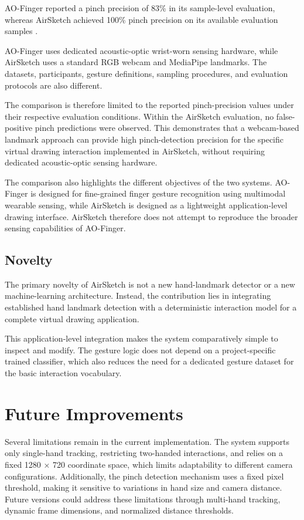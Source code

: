 \documentclass[conference]{IEEEtran}
\begin{document}
AO-Finger reported a pinch precision of 83\% in its sample-level evaluation, whereas AirSketch achieved 100\% pinch precision on its available evaluation samples \cite{ao_finger}.

AO-Finger uses dedicated acoustic-optic wrist-worn sensing hardware, while AirSketch uses a standard RGB webcam and MediaPipe landmarks. The datasets, participants, gesture definitions, sampling procedures, and evaluation protocols are also different.

The comparison is therefore limited to the reported pinch-precision values under their respective evaluation conditions. Within the AirSketch evaluation, no false-positive pinch predictions were observed. This demonstrates that a webcam-based landmark approach can provide high pinch-detection precision for the specific virtual drawing interaction implemented in AirSketch, without requiring dedicated acoustic-optic sensing hardware.

The comparison also highlights the different objectives of the two systems. AO-Finger is designed for fine-grained finger gesture recognition using multimodal wearable sensing, while AirSketch is designed as a lightweight application-level drawing interface. AirSketch therefore does not attempt to reproduce the broader sensing capabilities of AO-Finger.

\subsection{Novelty}
The primary novelty of AirSketch is not a new hand-landmark detector or a new machine-learning architecture. Instead, the contribution lies in integrating established hand landmark detection with a deterministic interaction model for a complete virtual drawing application.

This application-level integration makes the system comparatively simple to inspect and modify. The gesture logic does not depend on a project-specific trained classifier, which also reduces the need for a dedicated gesture dataset for the basic interaction vocabulary.

\section{Future Improvements}
Several limitations remain in the current implementation. The system supports only single-hand tracking, restricting two-handed interactions, and relies on a fixed 1280 × 720 coordinate space, which limits adaptability to different camera configurations. Additionally, the pinch detection mechanism uses a fixed pixel threshold, making it sensitive to variations in hand size and camera distance. Future versions could address these limitations through multi-hand tracking, dynamic frame dimensions, and normalized distance thresholds.
\end{document}
